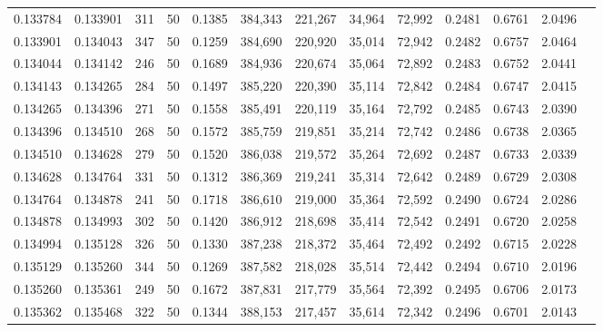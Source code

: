 \begin{tabular}{rrrrrrrrrrrrr}
0.133784 & 0.133901 &   311 &  50 &                                     0.1385 & 384,343 & 221,267 &  34,964 &  72,992 & 0.2481 & 0.6761 & 2.0496 \\
0.133901 & 0.134043 &   347 &  50 &                                     0.1259 & 384,690 & 220,920 &  35,014 &  72,942 & 0.2482 & 0.6757 & 2.0464 \\
0.134044 & 0.134142 &   246 &  50 &                                     0.1689 & 384,936 & 220,674 &  35,064 &  72,892 & 0.2483 & 0.6752 & 2.0441 \\
0.134143 & 0.134265 &   284 &  50 &                                     0.1497 & 385,220 & 220,390 &  35,114 &  72,842 & 0.2484 & 0.6747 & 2.0415 \\
0.134265 & 0.134396 &   271 &  50 &                                     0.1558 & 385,491 & 220,119 &  35,164 &  72,792 & 0.2485 & 0.6743 & 2.0390 \\
0.134396 & 0.134510 &   268 &  50 &                                     0.1572 & 385,759 & 219,851 &  35,214 &  72,742 & 0.2486 & 0.6738 & 2.0365 \\
0.134510 & 0.134628 &   279 &  50 &                                     0.1520 & 386,038 & 219,572 &  35,264 &  72,692 & 0.2487 & 0.6733 & 2.0339 \\
0.134628 & 0.134764 &   331 &  50 &                                     0.1312 & 386,369 & 219,241 &  35,314 &  72,642 & 0.2489 & 0.6729 & 2.0308 \\
0.134764 & 0.134878 &   241 &  50 &                                     0.1718 & 386,610 & 219,000 &  35,364 &  72,592 & 0.2490 & 0.6724 & 2.0286 \\
0.134878 & 0.134993 &   302 &  50 &                                     0.1420 & 386,912 & 218,698 &  35,414 &  72,542 & 0.2491 & 0.6720 & 2.0258 \\
0.134994 & 0.135128 &   326 &  50 &                                     0.1330 & 387,238 & 218,372 &  35,464 &  72,492 & 0.2492 & 0.6715 & 2.0228 \\
0.135129 & 0.135260 &   344 &  50 &                                     0.1269 & 387,582 & 218,028 &  35,514 &  72,442 & 0.2494 & 0.6710 & 2.0196 \\
0.135260 & 0.135361 &   249 &  50 &                                     0.1672 & 387,831 & 217,779 &  35,564 &  72,392 & 0.2495 & 0.6706 & 2.0173 \\
0.135362 & 0.135468 &   322 &  50 &                                     0.1344 & 388,153 & 217,457 &  35,614 &  72,342 & 0.2496 & 0.6701 & 2.0143 \\

\end{tabular}
